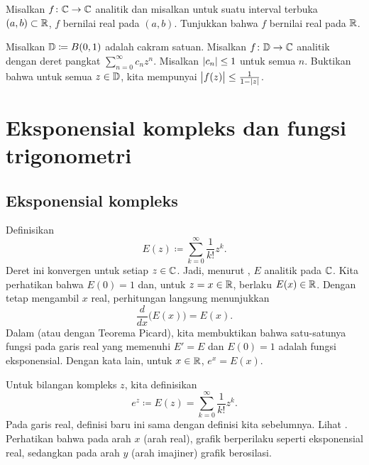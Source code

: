 \begin{exercise}
Misalkan $f \colon {\mathbb{C}} \to {\mathbb{C}}$ analitik dan misalkan untuk suatu
interval terbuka $(a,b) \subset {\mathbb{R}}$, $f$ bernilai real pada $(a,b)$.  Tunjukkan
bahwa $f$ bernilai real pada ${\mathbb{R}}$.
\end{exercise}

\begin{exercise}
Misalkan ${\mathbb{D}} \coloneqq B(0,1)$ adalah cakram satuan.  Misalkan
$f \colon {\mathbb{D}} \to {\mathbb{C}}$ analitik dengan deret pangkat
$\sum_{n=0}^\infty c_n z^n$.  Misalkan $\lvert {c_n} \rvert \leq 1$ untuk semua $n$.  Buktikan bahwa untuk
semua $z \in {\mathbb{D}}$, kita mempunyai
$\bigl\lvert {f(z)} \bigr\rvert \leq \frac{1}{1-\lvert {z} \rvert}$.
\end{exercise}


\sectionnewpage
\section{Eksponensial kompleks dan fungsi trigonometri}
\label{sec:complexexp}



\subsection{Eksponensial kompleks}

Definisikan
\begin{equation*}
E(z) \coloneqq \sum_{k=0}^\infty \frac{1}{k!} z^k .
\end{equation*}
Deret ini konvergen untuk setiap $z \in {\mathbb{C}}$.
Jadi, menurut
, $E$ analitik pada ${\mathbb{C}}$. Kita perhatikan bahwa $E(0) = 1$
dan, untuk $z=x \in {\mathbb{R}}$, berlaku $E(x) \in {\mathbb{R}}$. Dengan tetap mengambil $x$ real,
perhitungan langsung menunjukkan
\begin{equation*}
\frac{d}{dx} \bigl( E(x) \bigr) = E(x) .
\end{equation*}
Dalam  (atau dengan Teorema Picard), kita membuktikan bahwa
satu-satunya fungsi pada garis real yang memenuhi $E' = E$ dan
$E(0) = 1$ adalah fungsi eksponensial. Dengan kata lain, untuk $x \in {\mathbb{R}}$, $e^x = E(x)$.

Untuk bilangan kompleks $z$, kita definisikan
\begin{equation*}
e^z \coloneqq E(z) = 
\sum_{k=0}^\infty \frac{1}{k!} z^k .
\end{equation*}
Pada garis real, definisi baru ini sama dengan definisi kita sebelumnya.
Lihat . Perhatikan bahwa pada arah $x$
(arah real),
grafik berperilaku seperti eksponensial real, sedangkan pada arah $y$
(arah imajiner) grafik berosilasi.

